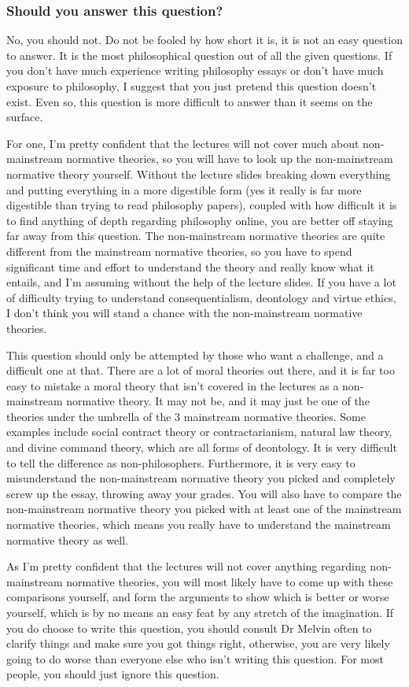 \documentclass[11pt]{article}
\begin{document}
\subsubsection{Should you answer this question?}
\label{sec:orgfb12cb8}
No, you should not. Do not be fooled by how short it is, it is not an easy question to answer. It is the most philosophical question out of all the given questions. If you don't have much experience writing philosophy essays or don't have much exposure to philosophy, I suggest that you just pretend this question doesn't exist. Even so, this question is more difficult to answer than it seems on the surface.

 \newpage

For one, I'm pretty confident that the lectures will not cover much about non-mainstream normative theories, so you will have to look up the non-mainstream normative theory yourself. Without the lecture slides breaking down everything and putting everything in a more digestible form (yes it really is far more digestible than trying to read philosophy papers), coupled with how difficult it is to find anything of depth regarding philosophy online, you are better off staying far away from this question. The non-mainstream normative theories are quite different from the mainstream normative theories, so you have to spend significant time and effort to understand the theory and really know what it entails, and I'm assuming without the help of the lecture slides. If you have a lot of difficulty trying to understand consequentialism, deontology and virtue ethics, I don't think you will stand a chance with the non-mainstream normative theories.

This question should only be attempted by those who want a challenge, and a difficult one at that. There are a lot of moral theories out there, and it is far too easy to mistake a moral theory that isn't covered in the lectures as a non-mainstream normative theory. It may not be, and it may just be one of the theories under the umbrella of the 3 mainstream normative theories. Some examples include social contract theory or contractarianism, natural law theory, and divine command theory, which are all forms of deontology. It is very difficult to tell the difference as non-philosophers. Furthermore, it is very easy to misunderstand the non-mainstream normative theory you picked and completely screw up the essay, throwing away your grades. You will also have to compare the non-mainstream normative theory you picked with at least one of the mainstream normative theories, which means you really have to understand the mainstream normative theory as well.

As I'm pretty confident that the lectures will not cover anything regarding non-mainstream normative theories, you will most likely have to come up with these comparisons yourself, and form the arguments to show which is better or worse yourself, which is by no means an easy feat by any stretch of the imagination. If you do choose to write this question, you should consult Dr Melvin often to clarify things and make sure you got things right, otherwise, you are very likely going to do worse than everyone else who isn't writing this question. For most people, you should just ignore this question.
\end{document}
